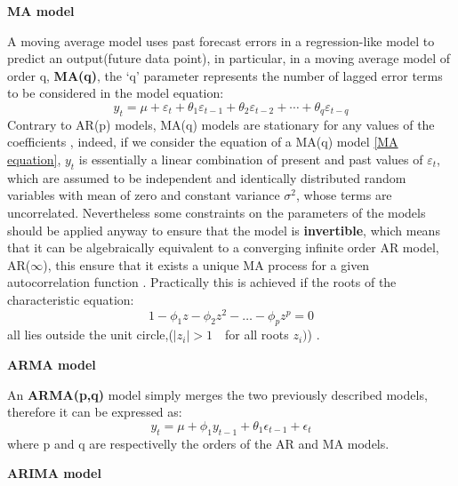 \textbf{MA model}

A moving average model uses past forecast errors in a regression-like model to predict an output(future data point), in particular, in a moving average model of order q, \textbf{MA(q)}, the ‘q’ parameter represents the number of lagged error terms to be considered in the model equation:
\begin{equation}
y_t = \mu + \varepsilon_t + \theta_1 \varepsilon_{t-1} + \theta_2 \varepsilon_{t-2} + \cdots + \theta_q \varepsilon_{t-q}
\label{MA equation}
\end{equation}
Contrary to AR(p) models, MA(q) models are stationary for any values of the coefficients \cite{chatfield2009}, indeed, if we consider the equation of a MA(q) model \eqref{MA equation}, \(y_t\) is essentially a linear combination of present and past values of \(\varepsilon_{t}\), which are assumed to be independent and identically distributed random variables with mean of zero and constant variance \( \sigma^2\), whose terms are uncorrelated. Nevertheless some constraints on the parameters of the models should be applied anyway to ensure that the model is \textbf{invertible}, which means that it can be algebraically equivalent to a converging infinite order AR model, AR(\(\infty\)), this ensure that it exists a unique MA process for a given autocorrelation function \cite{chatfield2009}. Practically this is achieved if the roots of the characteristic equation: 
\begin{equation}
 1 - \phi_1 z - \phi_2 z^2 - \ldots - \phi_p z^p = 0
\end{equation}
all lies outside the unit circle,(\(|z_i| > 1 \quad\)for all roots \(z_i)\)) \cite[pag. 50] {box1970time}.

\textbf{ARMA model}

An \textbf{ARMA(p,q)} model simply merges the two previously described models, therefore it can be expressed as: 
\begin{equation}
y_t = \mu + \phi_1 y_{t-1} + \theta_1 \epsilon_{t-1} + \epsilon_t
\end{equation}
where p and q are respectivelly the orders of the AR and MA models.

\textbf{ARIMA model}

